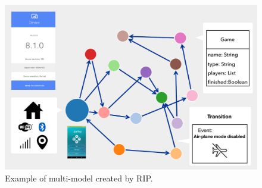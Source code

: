 \begin{figure}[t]
	\centering
	\includegraphics[width=1\textwidth]{img/multimodel-real.pdf}
	\vspace{-0.8cm}
	\caption{Example of multi-model created by RIP.}
	\label{real}
\end{figure} 

